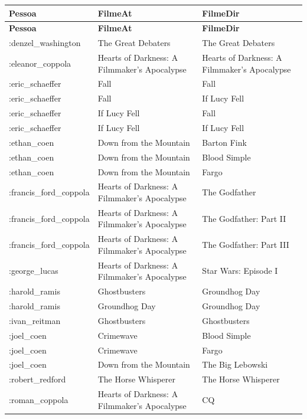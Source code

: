\documentclass[12pt,a4paper]{article}
\begin{document}
\begin{longtable}{|l|p{4.5cm}|p{4.5cm}|}
\hline
\textbf{Pessoa} & \textbf{FilmeAt} & \textbf{FilmeDir} \\
\hline
\endfirsthead
\hline
\textbf{Pessoa} & \textbf{FilmeAt} & \textbf{FilmeDir} \\
\hline
\endhead
:denzel\_washington & The Great Debaters & The Great Debaters \\
\hline
:eleanor\_coppola & Hearts of Darkness: A Filmmaker's Apocalypse & Hearts of Darkness: A Filmmaker's Apocalypse \\
\hline
:eric\_schaeffer & Fall & Fall \\
\hline
:eric\_schaeffer & Fall & If Lucy Fell \\
\hline
:eric\_schaeffer & If Lucy Fell & Fall \\
\hline
:eric\_schaeffer & If Lucy Fell & If Lucy Fell \\
\hline
:ethan\_coen & Down from the Mountain & Barton Fink \\
\hline
:ethan\_coen & Down from the Mountain & Blood Simple \\
\hline
:ethan\_coen & Down from the Mountain & Fargo \\
\hline
:francis\_ford\_coppola & Hearts of Darkness: A Filmmaker's Apocalypse & The Godfather \\
\hline
:francis\_ford\_coppola & Hearts of Darkness: A Filmmaker's Apocalypse & The Godfather: Part II \\
\hline
:francis\_ford\_coppola & Hearts of Darkness: A Filmmaker's Apocalypse & The Godfather: Part III \\
\hline
:george\_lucas & Hearts of Darkness: A Filmmaker's Apocalypse & Star Wars: Episode I \\
\hline
:harold\_ramis & Ghostbusters & Groundhog Day \\
\hline
:harold\_ramis & Groundhog Day & Groundhog Day \\
\hline
:ivan\_reitman & Ghostbusters & Ghostbusters \\
\hline
:joel\_coen & Crimewave & Blood Simple \\
\hline
:joel\_coen & Crimewave & Fargo \\
\hline
:joel\_coen & Down from the Mountain & The Big Lebowski \\
\hline
:robert\_redford & The Horse Whisperer & The Horse Whisperer \\
\hline
:roman\_coppola & Hearts of Darkness: A Filmmaker's Apocalypse & CQ \\

\end{longtable}
\end{document}

